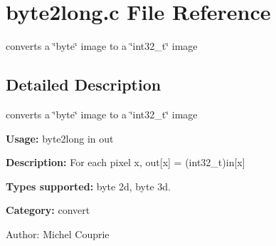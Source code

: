 \section{byte2long.c File Reference}
\label{byte2long_8c}
converts a \char`\"{}byte\char`\"{} image to a \char`\"{}int32\_\-t\char`\"{} image  




\label{_details}
\subsection{Detailed Description}
converts a \char`\"{}byte\char`\"{} image to a \char`\"{}int32\_\-t\char`\"{} image 

{\bf Usage:} byte2long in out

{\bf Description:} For each pixel x, out[x] = (int32\_\-t)in[x]

{\bf Types supported:} byte 2d, byte 3d.

{\bf Category:} convert

\begin{Desc}
\item[Author:]Michel Couprie \end{Desc}
